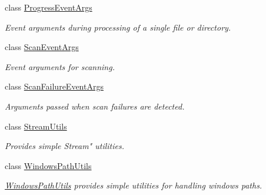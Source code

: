 \begin{DoxyCompactItemize}
class \hyperlink{class_i_c_sharp_code_1_1_sharp_zip_lib_1_1_core_1_1_progress_event_args}{Progress\+Event\+Args}
\begin{DoxyCompactList}\small\item\em Event arguments during processing of a single file or directory. \end{DoxyCompactList}\item 
class \hyperlink{class_i_c_sharp_code_1_1_sharp_zip_lib_1_1_core_1_1_scan_event_args}{Scan\+Event\+Args}
\begin{DoxyCompactList}\small\item\em Event arguments for scanning. \end{DoxyCompactList}\item 
class \hyperlink{class_i_c_sharp_code_1_1_sharp_zip_lib_1_1_core_1_1_scan_failure_event_args}{Scan\+Failure\+Event\+Args}
\begin{DoxyCompactList}\small\item\em Arguments passed when scan failures are detected. \end{DoxyCompactList}\item 
class \hyperlink{class_i_c_sharp_code_1_1_sharp_zip_lib_1_1_core_1_1_stream_utils}{Stream\+Utils}
\begin{DoxyCompactList}\small\item\em Provides simple Stream" utilities. \end{DoxyCompactList}\item 
class \hyperlink{class_i_c_sharp_code_1_1_sharp_zip_lib_1_1_core_1_1_windows_path_utils}{Windows\+Path\+Utils}
\begin{DoxyCompactList}\small\item\em \hyperlink{class_i_c_sharp_code_1_1_sharp_zip_lib_1_1_core_1_1_windows_path_utils}{Windows\+Path\+Utils} provides simple utilities for handling windows paths. \end{DoxyCompactList}\end{DoxyCompactItemize}
